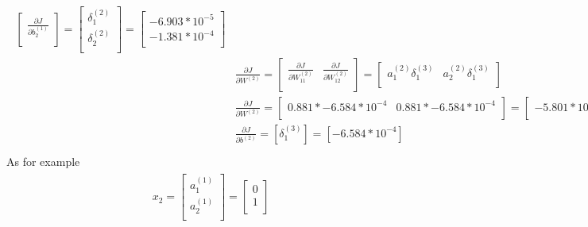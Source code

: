 \documentclass[leqno]{article}
\begin{document}
\begin{gather*}
\begin{split}
\begin{bmatrix}
  \frac{\partial J}{\partial b_2^{(1)}}\\
  \end{bmatrix}
  =
 \begin{bmatrix}
   \delta_1^{(2)}\\ 
   \delta_2^{(2)}\\
  \end{bmatrix}
  =
  \begin{bmatrix}
   -6.903*10^{-5}\\ 
   -1.381*10^{-4}\\
  \end{bmatrix}
\\
&\frac{\partial J}{\partial W^{(2)}} = 
 \begin{bmatrix}
   \frac{\partial J}{\partial W_{11}^{(2)}} & \frac{\partial J}{\partial W_{12}^{(2)}}\\ 
  \end{bmatrix}
  =
 \begin{bmatrix}
   a_1^{(2)}\delta_1^{(3)} & a_2^{(2)}\delta_1^{(3)}\\ 
  \end{bmatrix}
\\
&\frac{\partial J}{\partial W^{(2)}}   =
  \begin{bmatrix}
   0.881*-6.584*10^{-4} & 0.881*-6.584*10^{-4}\\ 
  \end{bmatrix}
  =
  \begin{bmatrix}
   -5.801*10^{-4} & -5.801*10^{-4}\\
  \end{bmatrix}
\\
&\frac{\partial J}{\partial b^{(2)}} = [\delta_1^{(3)}] = [-6.584*10^{-4}]\\
\end{split}
\end{gather*}
As for example 
\begin{gather*}
\begin{split}
&x_2 =
  \begin{bmatrix}
  a_1^{(1)}\\
  a_2^{(1)}\\ 
  \end{bmatrix}
  =
  \begin{bmatrix}
  0\\
  1\\ 
  \end{bmatrix}
\end{split}
\end{gather*}
\end{document}
